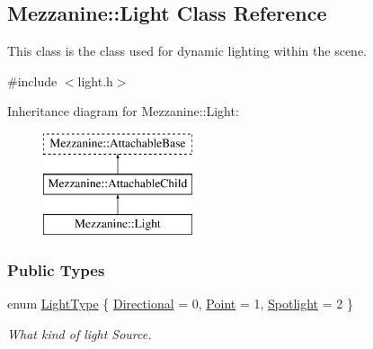 \hypertarget{classMezzanine_1_1Light}{
\subsection{Mezzanine::Light Class Reference}
\label{classMezzanine_1_1Light}
}


This class is the class used for dynamic lighting within the scene.  




{\ttfamily \#include $<$light.h$>$}

Inheritance diagram for Mezzanine::Light:\begin{figure}[H]
\begin{center}
\leavevmode
\includegraphics[height=3.000000cm]{classMezzanine_1_1Light}
\end{center}
\end{figure}
\subsubsection*{Public Types}
\begin{DoxyCompactItemize}
\item 
enum \hyperlink{classMezzanine_1_1Light_a783df27d8261c5af2226bc75586944be}{LightType} \{ \hyperlink{classMezzanine_1_1Light_a783df27d8261c5af2226bc75586944bea0374f1b4eee3903c6857838f0de8c48e}{Directional} =  0, 
\hyperlink{classMezzanine_1_1Light_a783df27d8261c5af2226bc75586944bea8922c0c85b8c971b99e636ff924bfb5d}{Point} =  1, 
\hyperlink{classMezzanine_1_1Light_a783df27d8261c5af2226bc75586944beab3af9a02884457e13f67d4bba11e4b4c}{Spotlight} =  2
 \}
\begin{DoxyCompactList}\small\item\em What kind of light Source. \item\end{DoxyCompactList}\end{DoxyCompactItemize}

